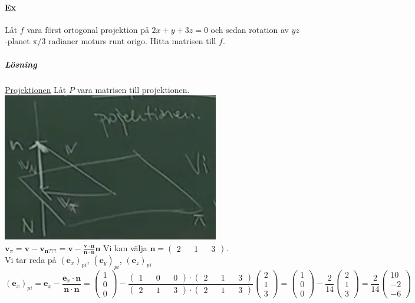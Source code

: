 \clearpage
\paragraph{Ex} Låt $f$ vara först ortogonal projektion på $2x+y+3z=0$ och sedan rotation av $yz$-planet $\pi/3$ radianer moturs runt origo.
Hitta matrisen till $f$.
\subparagraph{Lösning} \underline{Projektionen} Låt $P$ vara matrisen till projektionen.\\

\includegraphics[scale=0.5]{imgs/img01.png}\\

$\bm{v}_{\pi}=\bm{v}-\bm{v}_{\bm{n}???}=\bm{v}-\frac{\bm{v}\cdot \bm{n}}{\bm{n} \cdot \bm{n}}\bm{n}$
Vi kan välja $\bm{n}=\begin{pmatrix}2&&1&&3\end{pmatrix}$.\\
Vi tar reda på $(\bm{e}_{x})_{pi}$, $(\bm{e}_{y})_{pi}$, $(\bm{e}_{z})_{pi}$
\begin{equation*}
    (\bm{e}_{x})_{pi}=
    \bm{e}_{x}-\frac{\bm{e}_{x}\cdot \bm{n}}{\bm{n}\cdot \bm{n}}=
    \begin{pmatrix}1\\0\\0\end{pmatrix}-\frac{\begin{pmatrix}1&&0&&0\end{pmatrix}\cdot \begin{pmatrix}2&&1&&3\end{pmatrix}}{\begin{pmatrix}2&&1&&3\end{pmatrix}\cdot \begin{pmatrix}2&&1&&3\end{pmatrix}}\begin{pmatrix}2\\1\\3\end{pmatrix}=
    \begin{pmatrix}1\\0\\0\end{pmatrix}-\frac{2}{14}\begin{pmatrix}2\\1\\3\end{pmatrix}=
    \frac{2}{14}\begin{pmatrix}10\\-2\\-6\end{pmatrix}
\end{equation*}

